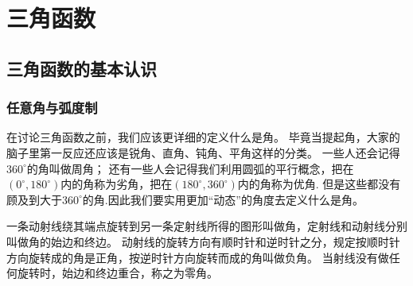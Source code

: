 \chapter{三角函数}
\section{三角函数的基本认识}
\subsection{任意角与弧度制}
在讨论三角函数之前，我们应该更详细的定义什么是角。
毕竟当提起角，大家的脑子里第一反应还应该是锐角、直角、钝角、平角这样的分类。
一些人还会记得$360^\circ $的角叫做周角；
还有一些人会记得我们利用圆弧的平行概念，把在$(0^\circ,180^\circ)$内的角称为劣角，把在$(180^\circ,360^\circ)$内的角称为优角.
但是这些都没有顾及到大于$360^\circ$的角.因此我们要实用更加“动态”的角度去定义什么是角。
\begin{definition}[任意角]
    一条动射线绕其端点旋转到另一条定射线所得的图形叫做角，定射线和动射线分别叫做角的始边和终边。
    动射线的旋转方向有顺时针和逆时针之分，规定按顺时针方向旋转成的角是正角，按逆时针方向旋转而成的角叫做负角。
    当射线没有做任何旋转时，始边和终边重合，称之为零角。
\end{definition}

